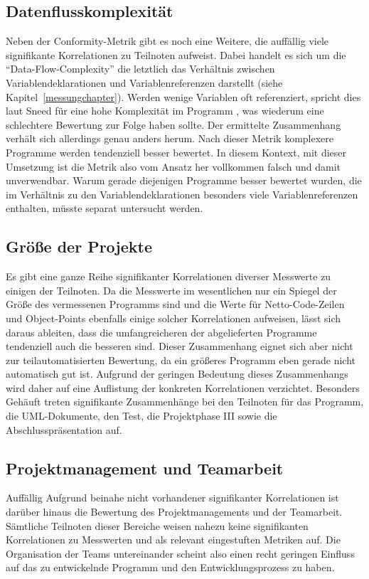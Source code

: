 \documentclass[da,ngerman]{stthesis}
\begin{document}
  			\subsection{Datenflusskomplexität}
  				Neben der Conformity-Metrik gibt es noch eine Weitere, die auffällig viele signifikante Korrelationen zu Teilnoten aufweist. Dabei handelt es sich um die "`Data-Flow-Complexity"' die letztlich das Verhältnis zwischen Variablendeklarationen und Variablenreferenzen darstellt (siehe Kapitel~\ref{messungchapter}). Werden wenige Variablen oft referenziert, spricht dies laut Sneed für eine hohe Komplexität im Programm \cite{SoftwareInZahlen}, was wiederum eine schlechtere Bewertung zur Folge haben sollte. Der ermittelte Zusammenhang verhält sich allerdings genau anders herum. Nach dieser Metrik komplexere Programme werden tendenziell besser bewertet. In diesem Kontext, mit dieser Umsetzung ist die Metrik also vom Ansatz her vollkommen falsch und damit unverwendbar. Warum gerade diejenigen Programme besser bewertet wurden, die im Verhältnis zu den Variablendeklarationen besonders viele Variablenreferenzen enthalten, müsste separat untersucht werden.
  			\subsection{Größe der Projekte}
  				Es gibt eine ganze Reihe signifikanter Korrelationen diverser Messwerte zu einigen der Teilnoten. Da die Messwerte im wesentlichen nur ein Spiegel der Größe des vermessenen Programms sind und die Werte für Netto-Code-Zeilen und Object-Points ebenfalls einige solcher Korrelationen aufweisen, lässt sich daraus ableiten, dass die umfangreicheren der abgelieferten Programme tendenziell auch die besseren sind. Dieser Zusammenhang eignet sich aber nicht zur teilautomatisierten Bewertung, da ein größeres Programm eben gerade nicht automatisch gut ist. Aufgrund der geringen Bedeutung dieses Zusammenhangs wird daher auf eine Auflistung der konkreten Korrelationen verzichtet. Besonders Gehäuft treten signifikante Zusammenhänge bei den Teilnoten für das Programm, die UML-Dokumente, den Test, die Projektphase III sowie die Abschlusspräsentation auf.
  			\subsection{Projektmanagement und Teamarbeit}
  				Auffällig Aufgrund beinahe nicht vorhandener signifikanter Korrelationen ist darüber hinaus die Bewertung des Projektmanagements und der Teamarbeit. Sämtliche Teilnoten dieser Bereiche weisen nahezu keine signifikanten Korrelationen zu Messwerten und als relevant eingestuften Metriken auf. Die Organisation der Teams untereinander scheint also einen recht geringen Einfluss auf das zu entwickelnde Programm und den Entwicklungsprozess zu haben.
\end{document}
